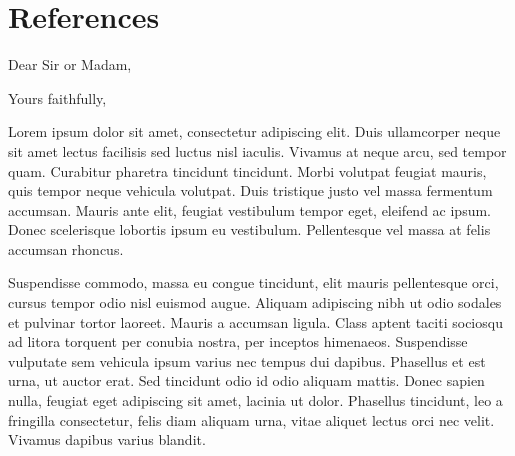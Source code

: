 \documentclass[11pt,letterpaper,sans]{moderncv}        %
\begin{document}
\section{References}
\begin{cvcolumns}
\end{cvcolumns}


\clearpage
\date{January 01, 1984}
\opening{Dear Sir or Madam,}
\closing{Yours faithfully,}
\makelettertitle

Lorem ipsum dolor sit amet, consectetur adipiscing elit. Duis ullamcorper neque sit amet lectus facilisis sed luctus nisl iaculis. Vivamus at neque arcu, sed tempor quam. Curabitur pharetra tincidunt tincidunt. Morbi volutpat feugiat mauris, quis tempor neque vehicula volutpat. Duis tristique justo vel massa fermentum accumsan. Mauris ante elit, feugiat vestibulum tempor eget, eleifend ac ipsum. Donec scelerisque lobortis ipsum eu vestibulum. Pellentesque vel massa at felis accumsan rhoncus.

Suspendisse commodo, massa eu congue tincidunt, elit mauris pellentesque orci, cursus tempor odio nisl euismod augue. Aliquam adipiscing nibh ut odio sodales et pulvinar tortor laoreet. Mauris a accumsan ligula. Class aptent taciti sociosqu ad litora torquent per conubia nostra, per inceptos himenaeos. Suspendisse vulputate sem vehicula ipsum varius nec tempus dui dapibus. Phasellus et est urna, ut auctor erat. Sed tincidunt odio id odio aliquam mattis. Donec sapien nulla, feugiat eget adipiscing sit amet, lacinia ut dolor. Phasellus tincidunt, leo a fringilla consectetur, felis diam aliquam urna, vitae aliquet lectus orci nec velit. Vivamus dapibus varius blandit.
\end{document}
